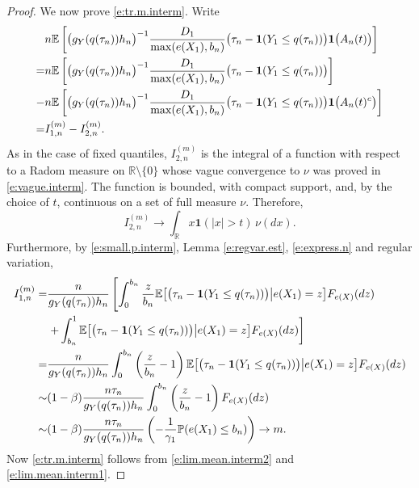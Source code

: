 \documentclass[12pt]{amsart}
\newcommand{\bbr}{\mathbb{R}}
\newcommand{\LFe}{F_{e(X)}}
\newcommand{\1}{\mathbbm{1}}
\newcommand{\0}{\mathbf{0}}
\newcommand{\one}{\mathbf{1}}
\newcommand{\E}{\mathbb{E}}
\theoremstyle{plain}
\theoremstyle{definition}
\newcommand{\bbP}{\mathbb{P}}
\begin{document}
\begin{proof}
We now prove \eqref{e:tr.m.interm}. Write
\begin{align*} \label{e:split.mean.interm}
&n\E\left[ \bigl(g_Y(q(\tau_n))h_n\bigr)^{-1}\frac{D_1}{\max(e(X_1),b_n)}
  \bigl( \tau_n-\one(Y_1\leq q(\tau_n))\bigr) \one\bigl( A_n(t)\bigr)\right] \\
\notag =&n\E\left[ \bigl(g_Y(q(\tau_n))h_n\bigr)^{-1}\frac{D_1}{\max(e(X_1),b_n)}
  \bigl( \tau_n-\one(Y_1\leq q(\tau_n))\bigr) \right] \\
 \notag -&n\E\left[ \bigl(g_Y(q(\tau_n))h_n\bigr)^{-1}\frac{D_1}{\max(e(X_1),b_n)}
  \bigl( \tau_n-\one(Y_1\leq q(\tau_n))\bigr) \one\bigl(
          A_n(t)^c\bigr)\right] \\
\notag =& I_{1,n}^{(m)} - I_{2,n}^{(m)}.
\end{align*}
%
As in the case of fixed quantiles, $ I_{2,n}^{(m)}$ is the integral of a function with
respect to a Radom measure on $\bbr\setminus \{0\}$ whose vague
convergence to $\nu$ was proved in \eqref{e:vague.interm}. The
function is bounded, with compact support, and, by the choice of $t$, 
continuous on a set of full measure $\nu$. Therefore, 
%
\begin{equation} \label{e:lim.mean.interm2}
  I_{2,n}^{(m)} \to \int_\bbr x\one(|x|>t)\, \nu(dx).
\end{equation}
%
Furthermore, by \eqref{e:small.p.interm}, Lemma \ref{e:regvar.est}, 
\eqref{e:express.n} and regular variation, 
\begin{align} \label{e:lim.mean.interm1}
 I_{1,n}^{(m)}=&\frac{n}{g_Y(q(\tau_n))h_n} \left[ \int_0^{b_n}
  \frac{z}{b_n}\E\bigl[ \bigl( \tau_n-\one(Y_1\leq
  q(\tau_n))\bigr)\big| e(X_1)=z\bigr] \LFe(dz) \right.\\
\notag &\left. + \int_{b_n}^1 
   \E\bigl[ \bigl( \tau_n-\one(Y_1\leq
  q(\tau_n))\bigr)\big| e(X_1)=z\bigr] \LFe(dz) \right]\\
\notag =& \frac{n}{g_Y(q(\tau_n))h_n}  \int_0^{b_n}
  \left( \frac{z}{b_n}-1\right)\E\bigl[ \bigl( \tau_n-\one(Y_1\leq
  q(\tau_n))\bigr)\big| e(X_1)=z\bigr] \LFe(dz) \\
\notag \sim& (1-\beta)  \frac{n\tau_n}{g_Y(q(\tau_n))h_n}  \int_0^{b_n}
  \left( \frac{z}{b_n}-1\right)  \LFe(dz)\\
\notag \sim& (1-\beta)  \frac{n\tau_n}{g_Y(q(\tau_n))h_n} \left(
             -\frac{1}{\gamma_1}\bbP(e(X_1)\leq b_n)\right) \to m. 
\end{align}
Now \eqref{e:tr.m.interm} follows from \eqref{e:lim.mean.interm2} and
\eqref{e:lim.mean.interm1}.


\end{proof}
\end{document}
